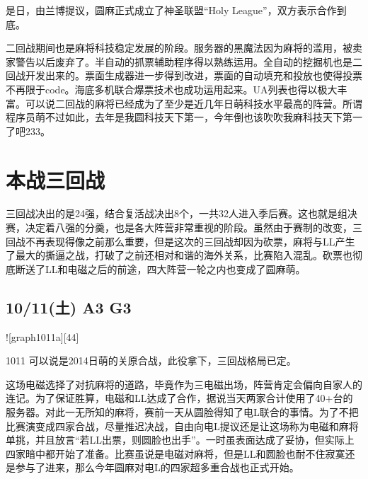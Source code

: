 是日，由兰博提议，圆麻正式成立了神圣联盟“Holy League”，双方表示合作到底。

二回战期间也是麻将科技稳定发展的阶段。服务器的黑魔法因为麻将的滥用，被卖家警告以后废弃了。半自动的抓票辅助程序得以熟练运用。全自动的挖掘机也是二回战开发出来的。票面生成器进一步得到改进，票面的自动填充和投放也使得投票不再限于code。海底多机联合爆票技术也成功运用起来。UA列表也得以极大丰富。可以说二回战的麻将已经成为了至少是近几年日萌科技水平最高的阵营。所谓程序员萌不过如此，去年是我圆科技天下第一，今年倒也该吹吹我麻科技天下第一了吧233。

\chapter{本战三回战}

三回战决出的是24强，结合复活战决出8个，一共32人进入季后赛。这也就是组决赛，决定着八强的分羹，也是各大阵营非常重视的阶段。虽然由于赛制的改变，三回战不再表现得像之前那么重要，但是这次的三回战却因为砍票，麻将与LL产生了最大的撕逼之战，打破了之前还相对和谐的海外关系，比赛陷入混乱。砍票也彻底断送了LL和电磁之后的前途，四大阵营一轮之内也变成了圆麻萌。

\section{10/11(土) A3 G3}


![graph1011a][44]

1011 可以说是2014日萌的关原合战，此役拿下，三回战格局已定。

这场电磁选择了对抗麻将的道路，毕竟作为三电磁出场，阵营肯定会偏向自家人的连记。为了保证胜算，电磁和LL达成了合作，据说当天两家合计使用了40+台的服务器。对此一无所知的麻将，赛前一天从圆脸得知了电L联合的事情。为了不把比赛演变成四家合战，尽量推迟决战，自由向电L提议还是让这场称为电磁和麻将单挑，并且放言“若LL出票，则圆脸也出手”。一时虽表面达成了妥协，但实际上四家暗中都开始了准备。比赛虽说是电磁对麻将，但是LL和圆脸也耐不住寂寞还是参与了进来，那么今年圆麻对电L的四家超多重合战也正式开始。

